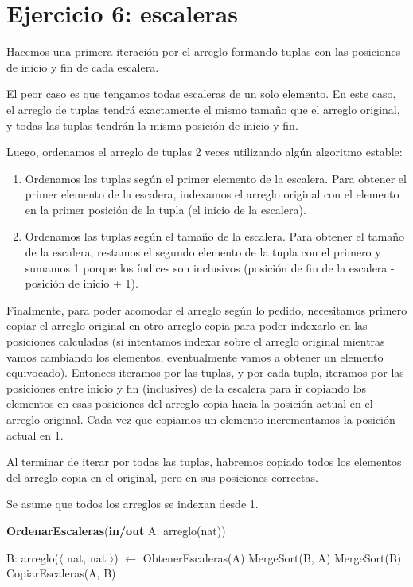 \section{Ejercicio 6: escaleras}

Hacemos una primera iteración por el arreglo formando tuplas con las posiciones de inicio y fin de cada escalera.

El peor caso es que tengamos todas escaleras de un solo elemento. En este caso, el arreglo de tuplas tendrá exactamente el mismo tamaño que el arreglo original, y todas las tuplas tendrán la misma posición de inicio y fin.

Luego, ordenamos el arreglo de tuplas 2 veces utilizando algún algoritmo estable:

\begin{enumerate}
    \item Ordenamos las tuplas según el primer elemento de la escalera. Para obtener el primer elemento de la escalera, indexamos el arreglo original con el elemento en la primer posición de la tupla (el inicio de la escalera).
    \item Ordenamos las tuplas según el tamaño de la escalera. Para obtener el tamaño de la escalera, restamos el segundo elemento de la tupla con el primero y sumamos 1 porque los índices son inclusivos (posición de fin de la escalera - posición de inicio + 1).
\end{enumerate}

Finalmente, para poder acomodar el arreglo según lo pedido, necesitamos primero copiar el arreglo original en otro arreglo copia para poder indexarlo en las posiciones calculadas (si intentamos indexar sobre el arreglo original mientras vamos cambiando los elementos, eventualmente vamos a obtener un elemento equivocado). Entonces iteramos por las tuplas, y por cada tupla, iteramos por las posiciones entre inicio y fin (inclusives) de la escalera para ir copiando los elementos en esas posiciones del arreglo copia hacia la posición actual en el arreglo original. Cada vez que copiamos un elemento incrementamos la posición actual en 1.

Al terminar de iterar por todas las tuplas, habremos copiado todos los elementos del arreglo copia en el original, pero en sus posiciones correctas.

Se asume que todos los arreglos se indexan desde 1.

\begin{algorithm}[H]
\caption{
    \textbf{OrdenarEscaleras}(\textbf{in/out} A: arreglo(nat))
}
\begin{algorithmic}[1]
    \State B: arreglo($\langle$ nat, nat $\rangle$) $\gets$ ObtenerEscaleras(A) 
    \State MergeSort(B, A) 
    \State MergeSort(B) 
    \State CopiarEscaleras(A, B) 
\end{algorithmic}
\end{algorithm}


